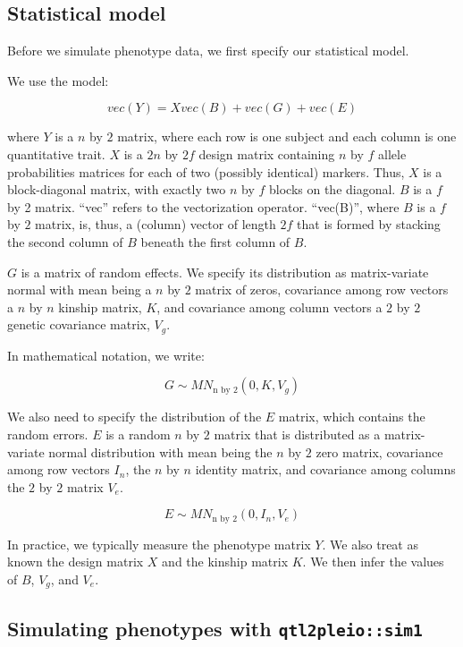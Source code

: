 \documentclass[oneside]{book}\usepackage[]{graphicx}\usepackage[]{color}
\begin{document}
\hypertarget{statistical-model}{%
\subsection{Statistical model}\label{statistical-model}}

Before we simulate phenotype data, we first specify our statistical
model.

We use the model:

\[vec(Y) = X vec(B) + vec(G) + vec(E)\]

where \(Y\) is a \(n\) by \(2\) matrix, where each row is one subject
and each column is one quantitative trait. \(X\) is a \(2n\) by \(2f\)
design matrix containing \(n\) by \(f\) allele probabilities matrices
for each of two (possibly identical) markers. Thus, \(X\) is a
block-diagonal matrix, with exactly two \(n\) by \(f\) blocks on the
diagonal. \(B\) is a \(f\) by 2 matrix. ``vec'' refers to the
vectorization operator. ``vec(B)'', where \(B\) is a \(f\) by \(2\)
matrix, is, thus, a (column) vector of length \(2f\) that is formed by
stacking the second column of \(B\) beneath the first column of \(B\).

\(G\) is a matrix of random effects. We specify its distribution as
matrix-variate normal with mean being a \(n\) by \(2\) matrix of zeros,
covariance among row vectors a \(n\) by \(n\) kinship matrix, \(K\), and
covariance among column vectors a \(2\) by \(2\) genetic covariance
matrix, \(V_g\).

In mathematical notation, we write:

\[G \sim MN_{\text{n by 2}}(0, K, V_g)\]

We also need to specify the distribution of the \(E\) matrix, which
contains the random errors. \(E\) is a random \(n\) by \(2\) matrix that
is distributed as a matrix-variate normal distribution with mean being
the \(n\) by \(2\) zero matrix, covariance among row vectors \(I_n\),
the \(n\) by \(n\) identity matrix, and covariance among columns the
\(2\) by \(2\) matrix \(V_e\).

\[E \sim MN_{\text{n by 2}}(0, I_n, V_e)\]

In practice, we typically measure the phenotype matrix \(Y\). We also
treat as known the design matrix \(X\) and the kinship matrix \(K\). We
then infer the values of \(B\), \(V_g\), and \(V_e\).

\hypertarget{simulating-phenotypes-with-qtl2pleiosim1}{%
\subsection{\texorpdfstring{Simulating phenotypes with
\texttt{qtl2pleio::sim1}}{Simulating phenotypes with qtl2pleio::sim1}}\label{simulating-phenotypes-with-qtl2pleiosim1}}
\end{document}
